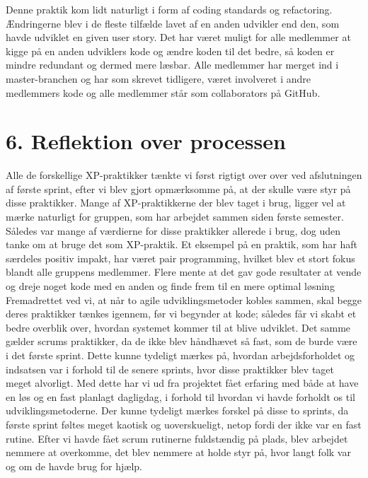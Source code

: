 \documentclass[11pt]{report}
\begin{document}
Denne praktik kom lidt naturligt i form af coding standards og refactoring. Ændringerne blev i de fleste tilfælde lavet af en anden udvikler end den, som havde udviklet en given user story. Det har været muligt for alle medlemmer at kigge på en anden udviklers kode og ændre koden til det bedre, så koden er mindre redundant og dermed mere læsbar. Alle medlemmer har merget ind i master-branchen og har som skrevet tidligere, været involveret i andre medlemmers kode og alle medlemmer står som collaborators på GitHub.

\chapter*{6. Reflektion over processen}

Alle de forskellige XP-praktikker tænkte vi først rigtigt over over ved afslutningen af første sprint, efter vi blev gjort opmærksomme på, at der skulle være styr på disse praktikker. Mange af XP-praktikkerne der blev taget i brug, ligger vel at mærke naturligt for gruppen, som har arbejdet sammen siden første semester. Således var mange af værdierne for disse praktikker allerede i brug, dog uden tanke om at bruge det som XP-praktik. 
Et eksempel på en praktik, som har haft særdeles positiv impakt, har været pair programming, hvilket blev et stort fokus blandt alle gruppens medlemmer. Flere mente at det gav gode resultater at vende og dreje noget kode med en anden og finde frem til en mere optimal løsning
Fremadrettet ved vi, at når to agile udviklingsmetoder kobles sammen, skal begge deres praktikker tænkes igennem, før vi begynder at kode; således får vi skabt et bedre overblik over, hvordan systemet kommer til at blive udviklet.
Det samme gælder scrums praktikker, da de ikke blev håndhævet så fast, som de burde være i det første sprint. Dette kunne tydeligt mærkes på, hvordan arbejdsforholdet og indsatsen var i forhold til de senere sprints, hvor disse praktikker blev taget meget alvorligt. Med dette har vi ud fra projektet fået erfaring med både at have en løs og en fast planlagt dagligdag, i forhold til hvordan vi havde forholdt os til udviklingsmetoderne. Der kunne tydeligt mærkes forskel på disse to sprints, da første sprint føltes meget kaotisk og uoverskueligt, netop fordi der ikke var en fast rutine. Efter vi havde fået scrum rutinerne fuldstændig på plads, blev arbejdet nemmere at overkomme, det blev nemmere at holde styr på, hvor langt folk var og om de havde brug for hjælp.
\end{document}
